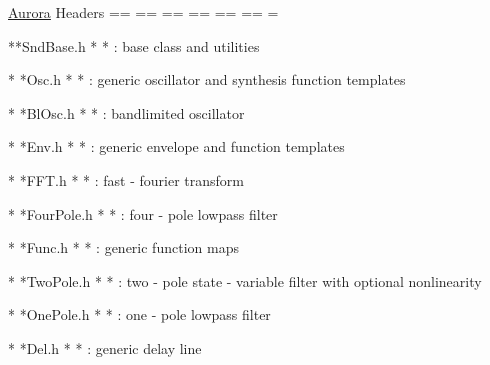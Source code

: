 \hyperlink{namespace_aurora}{Aurora} Headers == == == == == == = \begin{DoxyVerb}**SndBase.h * * : base class and
utilities

    * *Osc.h * * : generic oscillator and
synthesis function templates

    * *BlOsc.h * * : bandlimited oscillator

    * *Env.h * * : generic envelope and
function templates

        * *FFT.h * * : fast -
    fourier transform

        * *FourPole.h * * : four -
    pole lowpass filter

        * *Func.h * * : generic function maps

        * *TwoPole.h * * : two -
    pole state -
    variable filter with optional nonlinearity

        * *OnePole.h * * : one -
    pole lowpass filter

        * *Del.h * * : generic delay line\end{DoxyVerb}
 